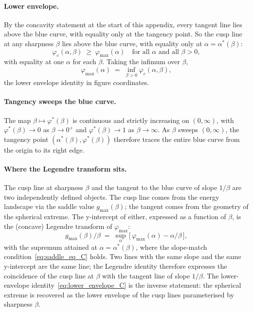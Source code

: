\documentclass[letterpaper]{article} %
\newcommand{\Bnet}{\beta}
\begin{document}
\paragraph{Lower envelope.}
By the concavity statement at the start of this appendix, every tangent line lies
above the blue curve, with equality only at the tangency point. So the cusp line
at any sharpness $\Bnet$ lies above the blue curve, with equality only at
$\alpha = \alpha^*(\Bnet)$:
\begin{equation}
\varphi_c(\alpha, \Bnet) \;\ge\; \varphi_{\max}(\alpha) \quad \text{for all $\alpha$ and all $\Bnet > 0$},
\end{equation}
with equality at one $\alpha$ for each $\Bnet$. Taking the infimum over $\Bnet$,
\begin{equation}
\varphi_{\max}(\alpha) \;=\; \inf_{\Bnet > 0} \varphi_c(\alpha, \Bnet),
\label{eq:lower_envelope_C}
\end{equation}
the lower envelope identity in figure coordinates.

\paragraph{Tangency sweeps the blue curve.}
The map $\Bnet \mapsto \varphi^*(\Bnet)$ is continuous and strictly increasing on
$(0, \infty)$, with $\varphi^*(\Bnet) \to 0$ as $\Bnet \to 0^+$ and
$\varphi^*(\Bnet) \to 1$ as $\Bnet \to \infty$. As $\Bnet$ sweeps $(0, \infty)$,
the tangency point $(\alpha^*(\Bnet), \varphi^*(\Bnet))$ therefore traces the
entire blue curve from the origin to its right edge.

\paragraph{Where the Legendre transform sits.}
The cusp line at sharpness $\Bnet$ and the tangent to the blue curve of slope
$1/\Bnet$ are two independently defined objects. The cusp line comes from the
energy landscape via the saddle value $g_{\max}(\Bnet)$; the tangent comes from
the geometry of the spherical extreme. The y-intercept of either, expressed as a
function of $\Bnet$, is the (concave) Legendre transform of $\varphi_{\max}$:
\begin{equation}
g_{\max}(\Bnet)/\Bnet \;=\; \sup_\alpha\,\bigl[\,\varphi_{\max}(\alpha) - \alpha/\Bnet\,\bigr],
\end{equation}
with the supremum attained at $\alpha = \alpha^*(\Bnet)$, where the slope-match
condition~\eqref{eq:saddle_eq_C} holds. Two lines with the same slope and the
same y-intercept are the same line; the Legendre identity therefore expresses
the coincidence of the cusp line at $\Bnet$ with the tangent line of slope
$1/\Bnet$. The lower-envelope identity~\eqref{eq:lower_envelope_C} is the
inverse statement: the spherical extreme is recovered as the lower envelope of
the cusp lines parameterised by sharpness $\Bnet$.
\end{document}
